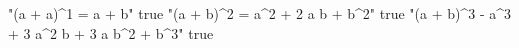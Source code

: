 "(a + a)^1 = a + b" true
"(a + b)^2 = a^2 + 2 a b + b^2" true
"(a + b)^3 - a^3 + 3 a^2 b + 3 a b^2 + b^3" true
